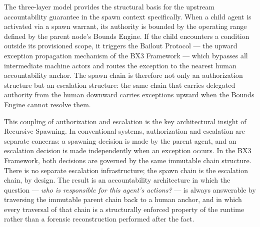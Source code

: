 The three-layer model provides the structural basis for the upstream accountability guarantee in the spawn context specifically. When a child agent is activated via a spawn warrant, its authority is bounded by the operating range defined by the parent node's Bounds Engine. If the child encounters a condition outside its provisioned scope, it triggers the Bailout Protocol \cite{bailoutprotocol2026} — the upward exception propagation mechanism of the BX3 Framework — which bypasses all intermediate machine actors and routes the exception to the nearest human accountability anchor. The spawn chain is therefore not only an authorization structure but an escalation structure: the same chain that carries delegated authority from the human downward carries exceptions upward when the Bounds Engine cannot resolve them.

This coupling of authorization and escalation is the key architectural insight of Recursive Spawning. In conventional systems, authorization and escalation are separate concerns: a spawning decision is made by the parent agent, and an escalation decision is made independently when an exception occurs. In the BX3 Framework, both decisions are governed by the same immutable chain structure. There is no separate escalation infrastructure; the spawn chain is the escalation chain, by design. The result is an accountability architecture in which the question — \emph{who is responsible for this agent's actions?} — is always answerable by traversing the immutable parent chain back to a human anchor, and in which every traversal of that chain is a structurally enforced property of the runtime rather than a forensic reconstruction performed after the fact.